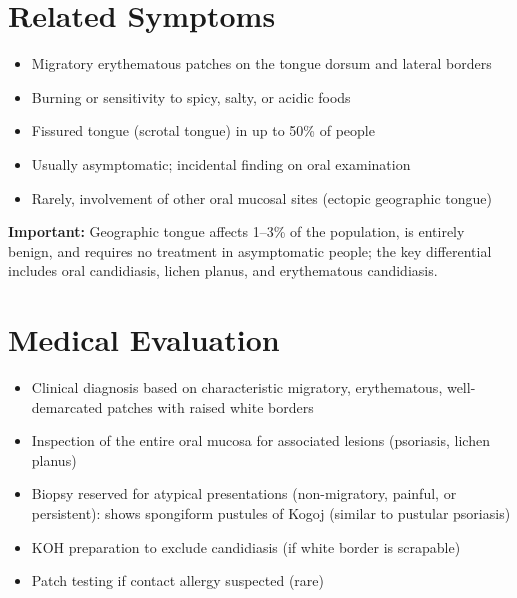 \section*{Related Symptoms}
\begin{itemize}
  \item Migratory erythematous patches on the tongue dorsum and lateral borders
  \item Burning or sensitivity to spicy, salty, or acidic foods
  \item Fissured tongue (scrotal tongue) in up to 50\% of people
  \item Usually asymptomatic; incidental finding on oral examination
  \item Rarely, involvement of other oral mucosal sites (ectopic geographic tongue)
\end{itemize}
\textbf{Important:} Geographic tongue affects 1--3\% of the population, is entirely benign, and requires no treatment in asymptomatic people; the key differential includes oral candidiasis, lichen planus, and erythematous candidiasis.

\section*{Medical Evaluation}
\begin{itemize}
  \item Clinical diagnosis based on characteristic migratory, erythematous, well-demarcated patches with raised white borders
  \item Inspection of the entire oral mucosa for associated lesions (psoriasis, lichen planus)
  \item Biopsy reserved for atypical presentations (non-migratory, painful, or persistent): shows spongiform pustules of Kogoj (similar to pustular psoriasis)
  \item KOH preparation to exclude candidiasis (if white border is scrapable)
  \item Patch testing if contact allergy suspected (rare)
\end{itemize}

